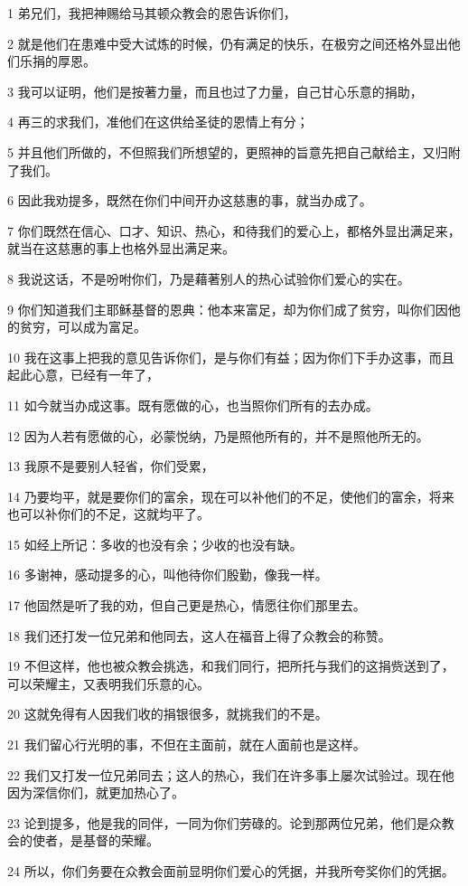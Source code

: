 \par 1 弟兄们，我把神赐给马其顿众教会的恩告诉你们，
\par 2 就是他们在患难中受大试炼的时候，仍有满足的快乐，在极穷之间还格外显出他们乐捐的厚恩。
\par 3 我可以证明，他们是按著力量，而且也过了力量，自己甘心乐意的捐助，
\par 4 再三的求我们，准他们在这供给圣徒的恩情上有分；
\par 5 并且他们所做的，不但照我们所想望的，更照神的旨意先把自己献给主，又归附了我们。
\par 6 因此我劝提多，既然在你们中间开办这慈惠的事，就当办成了。
\par 7 你们既然在信心、口才、知识、热心，和待我们的爱心上，都格外显出满足来，就当在这慈惠的事上也格外显出满足来。
\par 8 我说这话，不是吩咐你们，乃是藉著别人的热心试验你们爱心的实在。
\par 9 你们知道我们主耶稣基督的恩典：他本来富足，却为你们成了贫穷，叫你们因他的贫穷，可以成为富足。
\par 10 我在这事上把我的意见告诉你们，是与你们有益；因为你们下手办这事，而且起此心意，已经有一年了，
\par 11 如今就当办成这事。既有愿做的心，也当照你们所有的去办成。
\par 12 因为人若有愿做的心，必蒙悦纳，乃是照他所有的，并不是照他所无的。
\par 13 我原不是要别人轻省，你们受累，
\par 14 乃要均平，就是要你们的富余，现在可以补他们的不足，使他们的富余，将来也可以补你们的不足，这就均平了。
\par 15 如经上所记：多收的也没有余；少收的也没有缺。
\par 16 多谢神，感动提多的心，叫他待你们殷勤，像我一样。
\par 17 他固然是听了我的劝，但自己更是热心，情愿往你们那里去。
\par 18 我们还打发一位兄弟和他同去，这人在福音上得了众教会的称赞。
\par 19 不但这样，他也被众教会挑选，和我们同行，把所托与我们的这捐赀送到了，可以荣耀主，又表明我们乐意的心。
\par 20 这就免得有人因我们收的捐银很多，就挑我们的不是。
\par 21 我们留心行光明的事，不但在主面前，就在人面前也是这样。
\par 22 我们又打发一位兄弟同去；这人的热心，我们在许多事上屡次试验过。现在他因为深信你们，就更加热心了。
\par 23 论到提多，他是我的同伴，一同为你们劳碌的。论到那两位兄弟，他们是众教会的使者，是基督的荣耀。
\par 24 所以，你们务要在众教会面前显明你们爱心的凭据，并我所夸奖你们的凭据。

